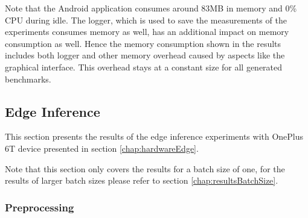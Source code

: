 Note that the Android application consumes around 83MB in memory and 0\% CPU during idle. The logger, which is used to save the measurements of the experiments consumes memory as well, has an additional impact on memory consumption as well. Hence the memory consumption shown in the results includes both logger and other memory overhead caused by aspects like the graphical interface. This overhead stays at a constant size for all generated benchmarks.


\subsection{Edge Inference}
\label{chap:EdgeResults}
This section presents the results of the edge inference experiments with OnePlus 6T device presented in section \ref{chap:hardwareEdge}.

Note that this section only covers the results for a batch size of one, for the results of larger batch sizes please refer to section \ref{chap:resultsBatchSize}.

\FloatBarrier
\subsubsection{Preprocessing}
\label{chap:edgePrepro}

